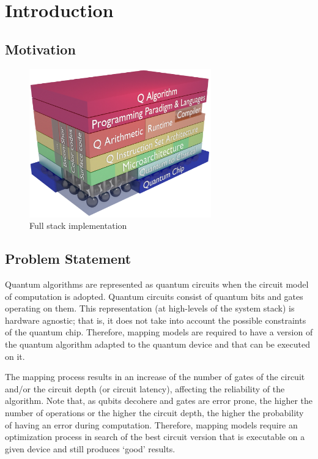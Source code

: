 
\chapter{Introduction}
\label{sec:org961b6e3}
\section{Motivation}
\label{sec:orgb5c1163}

\begin{figure}[htbp]
\centering
\includegraphics[width=0.7\textwidth]{figures/system_stack.png}
\caption{\label{fig:orgecea1a1}
Full stack implementation}
\end{figure}

\section{Problem Statement}
\label{sec:orgd35490c}

Quantum algorithms are represented as quantum circuits when the circuit model of computation is adopted. Quantum circuits consist of quantum bits and gates operating on them.
This representation (at high-levels of the system stack) is hardware agnostic; that is, it does not take into account the possible constraints of the quantum chip. Therefore, mapping models are required to have a version of the quantum algorithm adapted to the quantum device and that can be executed on it. 


The mapping process results in an increase of the number of gates of the circuit and/or the circuit depth (or circuit latency), affecting the reliability of the algorithm. Note that, as qubits decohere and gates are error prone, the higher the number of operations or the higher the circuit depth, the higher the probability of having an error during computation.  Therefore, mapping models require an optimization process in search of the best circuit version that is executable on a given device and still produces `good' results.

